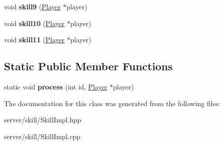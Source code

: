 \begin{DoxyCompactItemize}
\item 
\hypertarget{class_skill_impl_ad2114a5163b7af5f2c29a23fc7ea95a9}{void {\bfseries skill9} (\hyperlink{class_player}{Player} $\ast$player)}\label{class_skill_impl_ad2114a5163b7af5f2c29a23fc7ea95a9}

\item 
\hypertarget{class_skill_impl_ae9c84d2a6679080596a40c90f16b6276}{void {\bfseries skill10} (\hyperlink{class_player}{Player} $\ast$player)}\label{class_skill_impl_ae9c84d2a6679080596a40c90f16b6276}

\item 
\hypertarget{class_skill_impl_a3ecf3d79b6809cb6d2f8a2f8aa2b660c}{void {\bfseries skill11} (\hyperlink{class_player}{Player} $\ast$player)}\label{class_skill_impl_a3ecf3d79b6809cb6d2f8a2f8aa2b660c}

\end{DoxyCompactItemize}
\subsection*{Static Public Member Functions}
\begin{DoxyCompactItemize}
\item 
\hypertarget{class_skill_impl_ad7afafbf2bb2964013e6509c33817e8e}{static void {\bfseries process} (int id, \hyperlink{class_player}{Player} $\ast$player)}\label{class_skill_impl_ad7afafbf2bb2964013e6509c33817e8e}

\end{DoxyCompactItemize}


The documentation for this class was generated from the following files\-:\begin{DoxyCompactItemize}
\item 
server/skill/Skill\-Impl.\-hpp\item 
server/skill/Skill\-Impl.\-cpp\end{DoxyCompactItemize}
